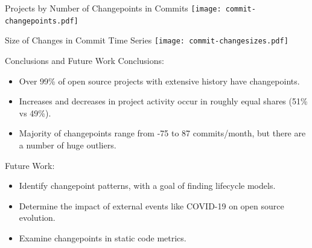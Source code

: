 \documentclass[11pt,handout]{beamer}
\begin{document}
\begin{frame}{Projects by Number of Changepoints in Commits}
    \texttt{[image: commit-changepoints.pdf]}
\end{frame}

\begin{frame}{Size of Changes in Commit Time Series}
    \texttt{[image: commit-changesizes.pdf]}
\end{frame}

\begin{frame}{Conclusions and Future Work}
    Conclusions:
    \begin{itemize}
        \item Over 99\% of open source projects with extensive history have changepoints.
        \item Increases and decreases in project activity occur in roughly equal shares (51\% vs 49\%).
        \item Majority of changepoints range from -75 to 87 commits/month, but there are a number of huge outliers.
    \end{itemize}
    Future Work:
    \begin{itemize}
        \item Identify changepoint patterns, with a goal of finding lifecycle models.
        \item Determine the impact of external events like COVID-19 on open source evolution.
        \item Examine changepoints in static code metrics.
    \end{itemize}
\end{frame}
\end{document}
